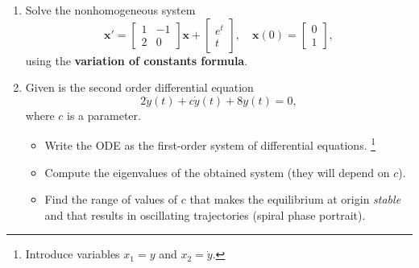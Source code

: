 \documentclass[a4paper,11pt,reqno]{amsart}
\numberwithin{equation}{section}
\begin{document}
\begin{enumerate}[1.]
  \item Solve the nonhomogeneous system
      \[
          \mathbf{x}' = \begin{bmatrix} 1 & -1 \\ 2 & 0 \end{bmatrix} \mathbf{x} + \begin{bmatrix} e^t \\ t \end{bmatrix}, \quad \mathbf{x}(0) = \begin{bmatrix} 0 \\ 1 \end{bmatrix},
      \]
      using the \textbf{variation of constants formula}.
      \begin{center}\setlength{\fboxsep}{10pt}
      \end{center}


  \item Given is the second order differential equation \[2 \ddot y (t) + c \dot y(t) + 8 y(t) = 0,\] where \(c\) is a parameter.
      \begin{itemize}
      \item[(i)] Write the ODE as the first-order system of differential
        equations. \footnote{Introduce variables \(x_{1} = y\) and \(x_{2} =
          \dot{y}\).}
      \item[(ii)] Compute the eigenvalues of the obtained system (they will depend on \(c\)).
      \item[(iii)] Find the range of values of \(c\) that makes the equilibrium at origin \emph{stable} and that results in oscillating trajectories (spiral phase portrait).
    \end{itemize}
      \begin{center}\setlength{\fboxsep}{10pt}
      \end{center}

\end{enumerate}
\end{document}
